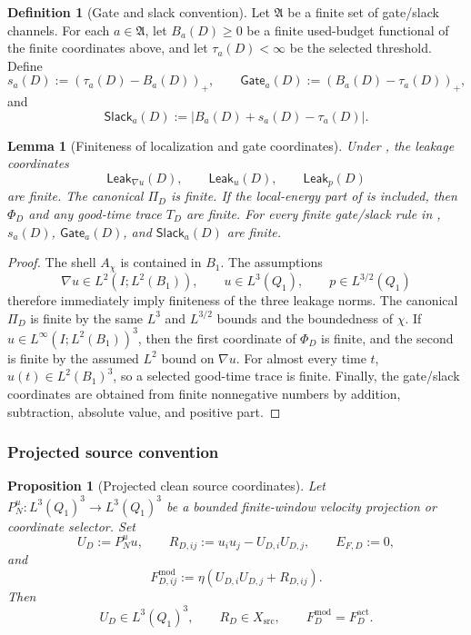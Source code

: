 \documentclass[11pt]{article}
\numberwithin{equation}{section}
\newtheorem{proposition}[proposition]{Proposition}
\newtheorem{lemma}[lemma]{Lemma}
\theoremstyle{definition}
\newtheorem{definition}[definition]{Definition}
\theoremstyle{remark}
\newcommand{\src}{\mathrm{src}}
\newcommand{\Leak}{\mathsf{Leak}}
\newcommand{\Gate}{\mathsf{Gate}}
\newcommand{\Slack}{\mathsf{Slack}}
\begin{document}
\begin{definition}[Gate and slack convention]
\label{def:gate-slack-realizability}
Let \(\mathfrak A\) be a finite set of gate/slack channels.  For each
\(a\in\mathfrak A\), let \(B_a(D)\ge0\) be a finite used-budget functional of
the finite coordinates above, and let \(\tau_a(D)<\infty\) be the selected
threshold.  Define
\[
    s_a(D):=(\tau_a(D)-B_a(D))_+,
    \qquad
    \Gate_a(D):=(B_a(D)-\tau_a(D))_+,
\]
and
\[
    \Slack_a(D):=|B_a(D)+s_a(D)-\tau_a(D)|.
\]
\end{definition}

\begin{lemma}[Finiteness of localization and gate coordinates]
\label{lem:localization-gate-finiteness}
Under , the leakage coordinates
\[
    \Leak_{\nabla u}(D),\qquad \Leak_u(D),\qquad \Leak_p(D)
\]
are finite.  The canonical \(\Pi_D\) is finite.  If the local-energy part of
 is included, then \(\Phi_D\) and any good-time
trace \(T_D\) are finite.  For every finite gate/slack rule in
, \(s_a(D)\), \(\Gate_a(D)\), and
\(\Slack_a(D)\) are finite.
\end{lemma}

\begin{proof}
The shell \(A_\chi\) is contained in \(B_1\).  The assumptions
\[
    \nabla u\in L^2(I;L^2(B_1)),
    \qquad
    u\in L^3(Q_1),
    \qquad
    p\in L^{3/2}(Q_1)
\]
therefore immediately imply finiteness of the three leakage norms.  The
canonical \(\Pi_D\) is finite by the same \(L^3\) and \(L^{3/2}\) bounds and the
boundedness of \(\chi\).  If \(u\in L^\infty(I;L^2(B_1))^3\), then the first
coordinate of \(\Phi_D\) is finite, and the second is finite by the assumed
\(L^2\) bound on \(\nabla u\).  For almost every time \(t\), \(u(t)\in
L^2(B_1)^3\), so a selected good-time trace is finite.  Finally, the gate/slack
coordinates are obtained from finite nonnegative numbers by addition,
subtraction, absolute value, and positive part.
\end{proof}

\subsubsection{Projected source convention}

\begin{proposition}[Projected clean source coordinates]
\label{prop:projected-source-coordinates}
Let \(P_N^u:L^3(Q_1)^3\to L^3(Q_1)^3\) be a bounded finite-window velocity
projection or coordinate selector.  Set
\[
    U_D:=P_N^u u,
    \qquad
    R_{D,ij}:=u_i u_j-U_{D,i}U_{D,j},
    \qquad
    E_{F,D}:=0,
\]
and
\[
    F^{\mathrm{mod}}_{D,ij}:=\eta(U_{D,i}U_{D,j}+R_{D,ij}).
\]
Then
\[
    U_D\in L^3(Q_1)^3,
    \qquad
    R_D\in X_{\src},
    \qquad
    F_D^{\mathrm{mod}}=F_D^{\mathrm{act}}.
\]
\end{proposition}
\end{document}

